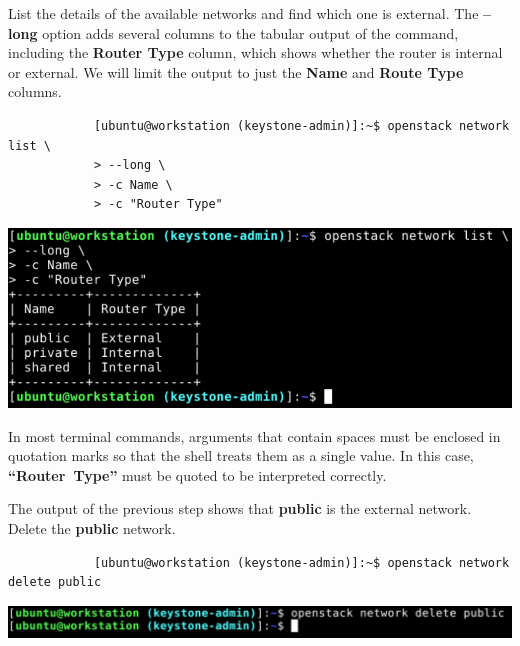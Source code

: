\documentclass[letterpaper, 12pt]{article}
\begin{document}
\begin{enumerate}
    \begin{labstep}
        List the details of the available networks and find which one is external.
        The \textbf{--long} option adds several columns to the tabular output of the command, including the \textbf{Router Type} column, which shows whether the router is internal or external.
        We will limit the output to just the \textbf{Name} and \textbf{Route Type} columns.
        \begin{lstlisting}
            [ubuntu@workstation (keystone-admin)]:~$ openstack network list \
            > --long \
            > -c Name \
            > -c "Router Type"
        \end{lstlisting}

        \begin{center}
            \includegraphics[width=\linewidth]{images/part1/step11.png}
        \end{center}
    \end{labstep}

    \begin{tipbox}
        In most terminal commands, arguments that contain spaces must be enclosed in quotation marks so that the shell treats them as a single value.
        In this case, \textbf{``Router~Type''} must be quoted to be interpreted correctly.
    \end{tipbox}

    \begin{labstep}
        The output of the previous step shows that \textbf{public} is the external network.
        Delete the \textbf{public} network.
        \begin{lstlisting}
            [ubuntu@workstation (keystone-admin)]:~$ openstack network delete public
        \end{lstlisting}

        \begin{center}
            \includegraphics[width=\linewidth]{images/part1/step12.png}
        \end{center}
    \end{labstep}


\end{enumerate}
\end{document}
